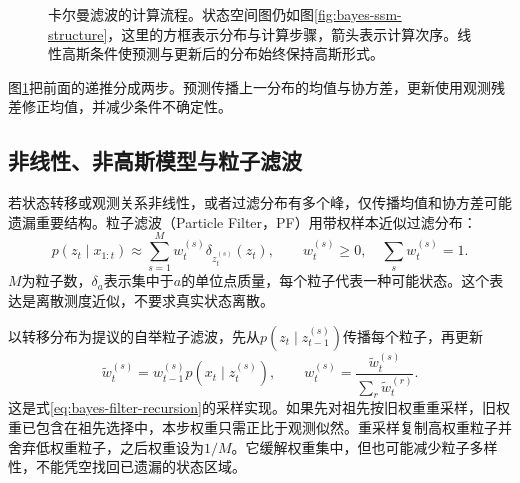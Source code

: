 \begin{figure}[htbp]
\centering
{}
\caption{卡尔曼滤波的计算流程。状态空间图仍如图\ref{fig:bayes-ssm-structure}，这里的方框表示分布与计算步骤，箭头表示计算次序。线性高斯条件使预测与更新后的分布始终保持高斯形式。}
\label{fig:bayes-kalman-recursion}
\end{figure}

图\ref{fig:bayes-kalman-recursion}把前面的递推分成两步。预测传播上一分布的均值与协方差，更新使用观测残差修正均值，并减少条件不确定性。

\subsection{非线性、非高斯模型与粒子滤波}
若状态转移或观测关系非线性，或者过滤分布有多个峰，仅传播均值和协方差可能遗漏重要结构。粒子滤波（Particle Filter，PF）用带权样本近似过滤分布：
\begin{equation}
 p(z_t\mid x_{1:t})\approx\sum_{s=1}^M w_t^{(s)}\delta_{z_t^{(s)}}(z_t),
 \qquad w_t^{(s)}\geq0,\quad\sum_s w_t^{(s)}=1.
\end{equation}
$M$为粒子数，$\delta_a$表示集中于$a$的单位点质量，每个粒子代表一种可能状态。这个表达是离散测度近似，不要求真实状态离散。

以转移分布为提议的自举粒子滤波，先从$p(z_t\mid z_{t-1}^{(s)})$传播每个粒子，再更新
\begin{equation}
 \widetilde w_t^{(s)}=w_{t-1}^{(s)}p(x_t\mid z_t^{(s)}),\qquad
 w_t^{(s)}=\frac{\widetilde w_t^{(s)}}{\sum_r\widetilde w_t^{(r)}}.
\end{equation}
这是式\eqref{eq:bayes-filter-recursion}的采样实现。如果先对祖先按旧权重重采样，旧权重已包含在祖先选择中，本步权重只需正比于观测似然。重采样复制高权重粒子并舍弃低权重粒子，之后权重设为$1/M$。它缓解权重集中，但也可能减少粒子多样性，不能凭空找回已遗漏的状态区域。

